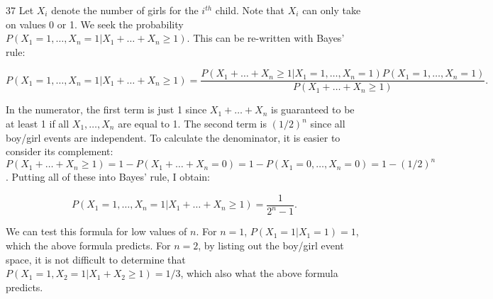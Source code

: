 \begin{problem} {37} Let $X_i$ denote the number of girls for the $i^{th}$ child.  Note that $X_i$ can only take on values 0 or 1.  We seek the probability $P(X_{1} =1, \ldots, X_{n} =1|X_1+ \ldots +X_n \ge 1)$.  This can be re-written with Bayes' rule:

\begin{equation}
P(X_{1} =1, \ldots, X_{n} =1|X_1+ \ldots +X_n \ge 1)= \frac{P(X_1+ \ldots +X_n \ge 1|X_{1} =1, \ldots, X_{n} =1)P(X_1=1, \ldots, X_n=1)}{P(X_1+ \ldots +X_n \ge 1)}.
\end{equation}

In the numerator, the first term is just 1 since $X_1+\ldots +X_n$ is guaranteed to be at least 1 if all $X_1, \ldots, X_n$ are equal to 1.  The second term is $(1/2)^n$ since all boy/girl events are independent.  To calculate the denominator, it is easier to consider its complement: $P(X_1+ \ldots +X_n \ge 1) = 1 - P(X_1+ \ldots +X_n=0)=1-P(X_1=0, \ldots, X_n=0)=1-(1/2)^n$.  Putting all of these into Bayes' rule, I obtain:


\begin{equation*}
P(X_{1} =1, \ldots, X_{n} =1|X_1+ \ldots +X_n \ge 1)= \frac{1}{2^n-1}.
\end{equation*}

We can test this formula for low values of $n$.  For $n=1$, $P(X_1=1|X_1=1) =1$, which the above formula predicts.  For $n=2$, by listing out the boy/girl event space,  it is not difficult to determine that $P(X_1=1, X_2=1| X_1+X_2\ge1) = 1/3$, which also what the above formula predicts.

\end{problem}

